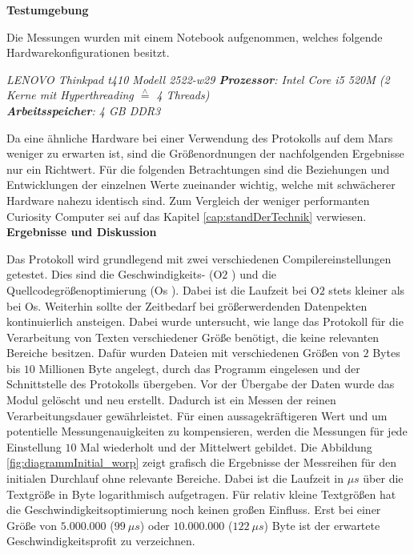 \textbf{Testumgebung}

Die Messungen wurden mit einem Notebook aufgenommen, welches
folgende Hardwarekonfigurationen besitzt.

\textit{
	LENOVO Thinkpad t410 Modell 2522-w29 \newline
	\textbf{Prozessor}: Intel Core i5 520M (2 Kerne mit Hyperthreading $\stackrel{\wedge}=$ 4 Threads)\\
	\textbf{Arbeitsspeicher}: 4 GB DDR3	
	}

Da eine ähnliche Hardware bei einer Verwendung des Protokolls auf dem Mars
weniger zu erwarten ist, sind die Größenordnungen der nachfolgenden Ergebnisse
nur ein Richtwert. Für die folgenden Betrachtungen sind die Beziehungen und
Entwicklungen der einzelnen Werte zueinander wichtig, welche mit schwächerer
Hardware nahezu identisch sind. Zum Vergleich der weniger performanten Curiosity
Computer sei auf das Kapitel \ref{cap:standDerTechnik} verwiesen. 
\\

\textbf{Ergebnisse und Diskussion}

Das Protokoll wird grundlegend mit zwei verschiedenen
Compilereinstellungen getestet. Dies sind die Geschwindigkeits- (\glqq O$2$
\grqq) und die Quellcodegrößenoptimierung (\glqq Os \grqq). 
\newline
Dabei ist die Laufzeit bei O$2$ stets kleiner als bei Os. Weiterhin sollte der
Zeitbedarf bei größerwerdenden Datenpekten kontinuierlich ansteigen.
\newline
Dabei wurde untersucht, wie lange das Protokoll für die Verarbeitung von Texten
verschiedener Größe benötigt, die keine relevanten Bereiche besitzen. Dafür
wurden Dateien mit verschiedenen Größen von $2$ Bytes bis $10$ Millionen Byte 
angelegt, durch das Programm eingelesen und der Schnittstelle des Protokolls
übergeben. Vor der Übergabe der Daten wurde das Modul gelöscht und neu erstellt.
Dadurch ist ein Messen der reinen Verarbeitungsdauer gewährleistet. Für einen
aussagekräftigeren Wert und um potentielle Messungenauigkeiten zu kompensieren,
werden die Messungen für jede Einstellung $10$ Mal wiederholt und der Mittelwert
gebildet.
\newline
Die Abbildung \ref{fig:diagrammInitial_worp} zeigt grafisch die Ergebnisse der
Messreihen für den initialen Durchlauf ohne relevante Bereiche. Dabei ist die
Laufzeit in $\mu s$ über die Textgröße in Byte logarithmisch aufgetragen. Für
relativ kleine Textgrößen hat die Geschwindigkeitsoptimierung noch keinen großen
Einfluss. Erst bei einer Größe von $5.000.000$ ($99\ \mu s$) oder
$10.000.000$ ($122\ \mu s$) Byte ist der erwartete Geschwindigkeitsprofit zu
verzeichnen.


